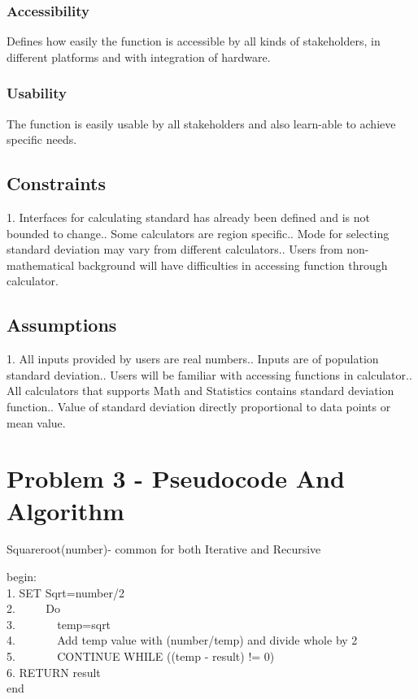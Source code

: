\documentclass[a4paper,11pt]{article}
\begin{document}
\begin{titlepage}
\subsubsection{Accessibility}
Defines how easily the function is accessible by all kinds of stakeholders, in different platforms and with integration of hardware.
\subsubsection{Usability}
The function is easily usable by all stakeholders and also learn-able to achieve specific needs.

\subsection{Constraints}
1.	Interfaces for calculating standard has already been defined and is not bounded to change..	Some calculators are region specific..  Mode for selecting standard deviation may vary from different calculators..  Users from non-mathematical background will have difficulties in accessing function through calculator.

\subsection{Assumptions}
1.	All inputs provided by users are real numbers..	Inputs are of population standard deviation..	Users will be familiar with accessing functions in calculator..	All calculators that supports Math and Statistics contains standard deviation function..	Value of standard deviation directly proportional to data points or mean value.

\section{Problem 3 - Pseudocode And Algorithm}
\begin{algorithm}
\caption{Squareroot(number)- common for both Iterative and Recursive}
begin: \\
1. SET Sqrt=number/2\\
2. $\hspace{2em}$ Do\\
3. $\hspace{3em}$ temp=sqrt\\
4. $\hspace{3em}$ Add temp value with (number/temp) and divide whole by 2\\
5. $\hspace{3em}$ CONTINUE WHILE ((temp - result) != 0)\\
6. RETURN result\\
end
\end{algorithm}

\end{titlepage}
\end{document}
